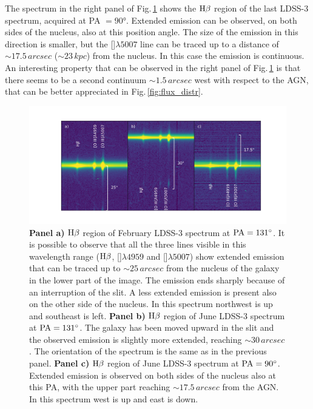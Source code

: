 \documentclass[../main.tex]{subfiles}
\begin{document}
The spectrum in the right panel of Fig.\,\ref{fig:three_spectra} shows the $\rm H\beta$ region of the last LDSS-3 spectrum, acquired at PA $=\ang{90}$.
Extended emission can be observed, on both sides of the nucleus, also at this position angle.
The size of the emission in this direction is smaller, but the []$\lambda5007$ line can be traced up to a distance of $\sim 17.5\,\si{arcsec}$ ($\sim 23\,\si{kpc}$) from the nucleus.
In this case the emission is continuous.
An interesting property that can be observed in the right panel of Fig.\,\ref{fig:three_spectra} is that there seems to be a second continuum $\sim 1.5\,\si{arcsec}$ west with respect to the AGN, that can be better appreciated in Fig.\,\ref{fig:flux_distr}.

\begin{figure}
\centering
\includegraphics[width=1.1\textwidth]{images/paper3/spectra.jpg} 
\caption[]{\textbf{Panel a)} $\rm H\beta$ region of February LDSS-3 spectrum at $\rm PA=\ang{131}$. It is possible to observe that all the three lines visible in this wavelength range ($\rm H\beta$, []$\lambda4959$ and []$\lambda5007$) show extended emission that can be traced up to $\sim 25\,\si{arcsec}$ from the nucleus of the galaxy in the lower part of the image. The emission ends sharply because of an interruption of the slit. A less extended emission is present also on the other side of the nucleus. In this spectrum northwest is up and southeast is left. \textbf{Panel b)}  $\rm H\beta$ region of June LDSS-3 spectrum at $\rm PA=\ang{131}$. The galaxy has been moved upward in the slit and the observed emission is slightly more extended, reaching $\sim 30\,\si{arcsec}$. The orientation of the spectrum is the same as in the previous panel. \textbf{Panel c)} $\rm H\beta$ region of June LDSS-3 spectrum at $\rm PA=\ang{90}$. Extended emission is observed on both sides of the nucleus also at this PA, with the upper part reaching $\sim 17.5\,\si{arcsec}$ from the AGN. In this spectrum west is up and east is down.}
\label{fig:three_spectra}
\end{figure}
\end{document}
